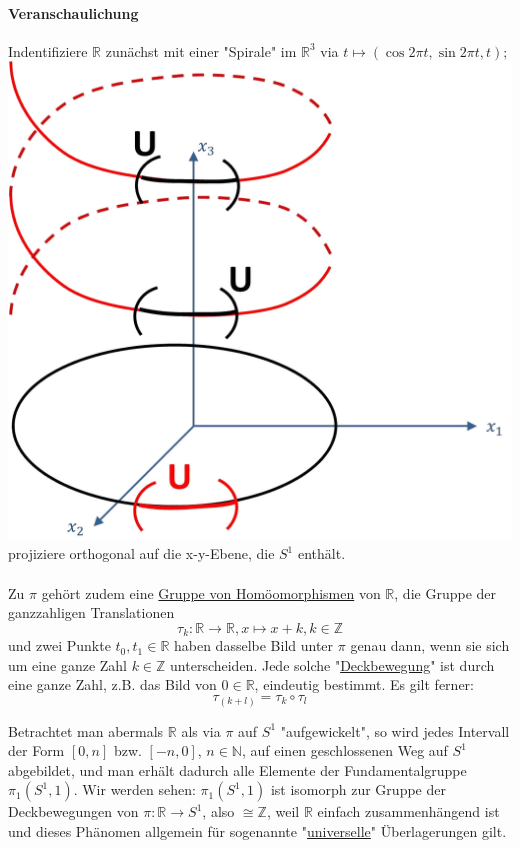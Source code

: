 \documentclass[a4paper,11pt,notitlepage]{report}
\theoremstyle{definition}
\newcommand{\R}{{\ensuremath{\mathbb{R}}}}
\newcommand{\N}{{\ensuremath{\mathbb{N}}}}
\newcommand{\Z}{{\ensuremath{\mathbb{Z}}}}
\begin{document}
\paragraph{Veranschaulichung}
Indentifiziere $\R$ zunächst mit einer "Spirale" im $\R^3$ via $t \mapsto (\cos 2 \pi t, \sin 2 \pi t, t);$\newline \includegraphics[scale=0.4]{images/U_Spirale.png} \newline
projiziere orthogonal auf die x-y-Ebene, die $S^1$ enthält.

\paragraph{}
Zu $\pi$ gehört zudem eine \underline{Gruppe von Homöomorphismen} von $\R$, die Gruppe der ganzzahligen Translationen $$\tau_k \colon \R \rightarrow \R, x \mapsto x + k, k \in \Z$$
und zwei Punkte $t_0, t_1 \in \R$ haben dasselbe Bild unter $\pi$ genau dann, wenn sie sich um eine ganze Zahl $k \in \Z$ unterscheiden.
\newline
Jede solche "\underline{Deckbewegung}" ist durch eine ganze Zahl, z.B. das Bild von $0 \in \R$, eindeutig bestimmt.
\newline
Es gilt ferner:
$$\tau_{(k+l)} = \tau_k \circ \tau_l$$

Betrachtet man abermals $\R$ als via $\pi$ auf $S^1$ "aufgewickelt", so wird jedes Intervall der Form $[0,n]$ bzw. $[-n,0]$, $n \in \N$, auf einen geschlossenen Weg auf $S^1$ abgebildet, und man erhält dadurch alle Elemente der Fundamentalgruppe $\pi_1(S^1,1)$.
\newline
Wir werden sehen: $\pi_1(S^1,1)$ ist isomorph zur Gruppe der Deckbewegungen von $\pi \colon \R \rightarrow S^1$, also $\cong \Z$, weil $\R$ einfach zusammenhängend ist und dieses Phänomen allgemein für sogenannte "\underline{universelle}" Überlagerungen gilt.
\newline
\end{document}
